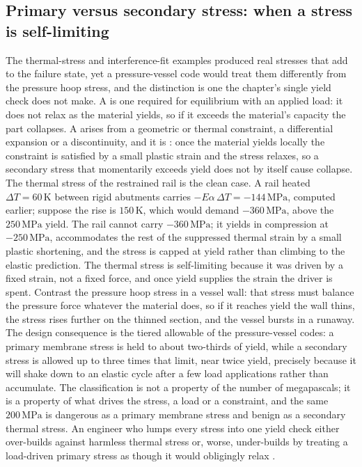 \subsection{Primary versus secondary stress: when a stress is self-limiting}

The thermal-stress and interference-fit examples produced real stresses
that add to the failure state, yet a pressure-vessel code would treat them
differently from the pressure hoop stress, and the distinction is one the
chapter's single yield check does not make. A  is
one required for equilibrium with an applied load: it does not relax as
the material yields, so if it exceeds the material's capacity the part
collapses. A  arises from a geometric or thermal
constraint, a differential expansion or a discontinuity, and it is
: once the material yields locally the constraint
is satisfied by a small plastic strain and the stress relaxes, so a
secondary stress that momentarily exceeds yield does not by itself cause
collapse. The thermal stress of the restrained rail is the clean case. A
rail heated $\Delta T = 60\,\text{K}$ between rigid abutments carries
$-E\alpha\,\Delta T = -144\,\text{MPa}$, computed earlier; suppose the
rise is $150\,\text{K}$, which would demand $-360\,\text{MPa}$, above the
$250\,\text{MPa}$ yield. The rail cannot carry $-360\,\text{MPa}$; it
yields in compression at $-250\,\text{MPa}$, accommodates the rest of the
suppressed thermal strain by a small plastic shortening, and the stress
is capped at yield rather than climbing to the elastic prediction. The
thermal stress is self-limiting because it was driven by a fixed strain,
not a fixed force, and once yield supplies the strain the driver is
spent. Contrast the pressure hoop stress in a vessel wall: that stress
must balance the pressure force whatever the material does, so if it
reaches yield the wall thins, the stress rises further on the thinned
section, and the vessel bursts in a runaway. The design consequence is
the tiered allowable of the pressure-vessel codes: a primary membrane
stress is held to about two-thirds of yield, while a secondary stress is
allowed up to three times that limit, near twice yield, precisely because
it will shake down to an elastic cycle after a few load applications
rather than accumulate. The classification is not a property of the number
of megapascals; it is a property of what drives the stress, a load or a
constraint, and the same $200\,\text{MPa}$ is dangerous as a primary
membrane stress and benign as a secondary thermal stress. An engineer who
lumps every stress into one yield check either over-builds against
harmless thermal stress or, worse, under-builds by treating a load-driven
primary stress as though it would obligingly relax \cite[ch.~13]{text:dowling-mechanical-behavior}.

